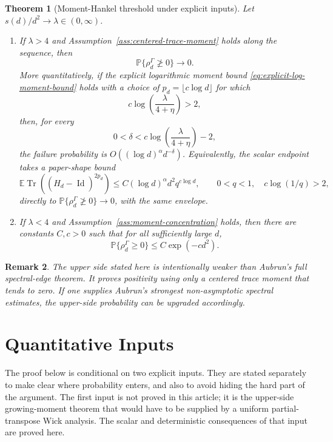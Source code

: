 \documentclass[11pt,reqno]{amsart}
\newtheorem{theorem}{Theorem}[section]
\newtheorem{remark}[theorem]{Remark}
\newcommand{\PP}{\mathbb P}
\newcommand{\EE}{\mathbb E}
\newcommand{\Tr}{\operatorname{Tr}}
\newcommand{\Id}{\operatorname{Id}}
\begin{document}
\begin{theorem}[Moment-Hankel threshold under explicit inputs]
\label{thm:ppt-threshold}
Let \(s(d)/d^2\to\lambda\in(0,\infty)\).

\begin{enumerate}[label=(\roman*),leftmargin=*]
\item If \(\lambda>4\) and Assumption~\ref{ass:centered-trace-moment}
  holds along the sequence, then
  \[
    \PP\{\rho_d^\Gamma\ngeq0\}\longrightarrow0.
  \]
  More quantitatively, if the explicit logarithmic moment bound
  \eqref{eq:explicit-log-moment-bound} holds with a choice of
  \(p_d=\lfloor c\log d\rfloor\) for which
  \[
    c\log\left(\frac{\lambda}{4+\eta}\right)>2,
  \]
  then, for every
  \[
    0<\delta<c\log\left(\frac{\lambda}{4+\eta}\right)-2,
  \]
  the failure probability is \(O((\log d)^\alpha d^{-\delta})\).
  Equivalently, the scalar endpoint takes a paper-shape bound
  \[
    \EE\Tr((\widehat H_d-\Id)^{2p_d})
    \le C(\log d)^\alpha d^2q^{c\log d},
    \qquad 0<q<1,\quad c\log(1/q)>2,
  \]
  directly to \(\PP\{\rho_d^\Gamma\ngeq0\}\to0\), with the same envelope.
\item If \(\lambda<4\) and Assumption~\ref{ass:moment-concentration} holds,
  then there are constants \(C,c>0\) such that for all
  sufficiently large \(d\),
  \[
    \PP\{\rho_d^\Gamma\ge0\}
    \le C\exp(-c d^2).
  \]
\end{enumerate}
\end{theorem}

\begin{remark}
The upper side stated here is intentionally weaker than Aubrun's full
spectral-edge theorem.  It proves positivity using only a centered trace
moment that tends to zero.  If one supplies Aubrun's strongest
non-asymptotic spectral estimates, the upper-side probability can be upgraded
accordingly.
\end{remark}

\section{Quantitative Inputs}

The proof below is conditional on two explicit inputs.  They are stated
separately to make clear where probability enters, and also to avoid hiding
the hard part of the argument.  The first input is not proved in this article;
it is the upper-side growing-moment theorem that would have to be supplied by a
uniform partial-transpose Wick analysis.  The scalar and deterministic
consequences of that input are proved here.
\end{document}
